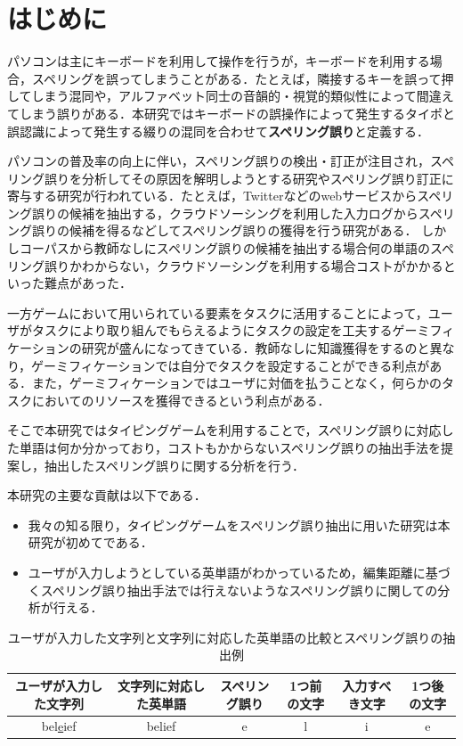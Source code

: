 \documentclass{jarticle}
\begin{document}
\mktitle
%
\renewcommand{\baselinestretch}{1.1}\small
%

\section{はじめに}
パソコンは主にキーボードを利用して操作を行うが，キーボードを利用する場合，スペリングを誤ってしまうことがある．たとえば，隣接するキーを誤って押してしまう混同や，アルファベット同士の音韻的・視覚的類似性によって間違えてしまう誤りがある．本研究ではキーボードの誤操作によって発生するタイポと誤認識によって発生する綴りの混同を合わせて\textbf{スペリング誤り}と定義する．

パソコンの普及率の向上に伴い，スペリング誤りの検出・訂正が注目され，スペリング誤りを分析してその原因を解明しようとする研究やスペリング誤り訂正に寄与する研究が行われている．たとえば，Twitterなどのwebサービスからスペリング誤りの候補を抽出する\cite{aramakiNLP2010}，クラウドソーシングを利用した入力ログからスペリング誤りの候補を得る\cite{babaACL2012}などしてスペリング誤りの獲得を行う研究がある．
しかしコーパスから教師なしにスペリング誤りの候補を抽出する場合何の単語のスペリング誤りかわからない，クラウドソーシングを利用する場合コストがかかるといった難点があった．

一方ゲームにおいて用いられている要素をタスクに活用することによって，ユーザがタスクにより取り組んでもらえるようにタスクの設定を工夫するゲーミフィケーションの研究が盛んになってきている\cite{deterdingACM2011}．教師なしに知識獲得をするのと異なり，ゲーミフィケーションでは自分でタスクを設定することができる利点がある．また，ゲーミフィケーションではユーザに対価を払うことなく，何らかのタスクにおいてのリソースを獲得できるという利点がある．

そこで本研究ではタイピングゲームを利用することで，スペリング誤りに対応した単語は何か分かっており，コストもかからないスペリング誤りの抽出手法を提案し，抽出したスペリング誤りに関する分析を行う．

本研究の主要な貢献は以下である．

\begin{itemize}
 \item 我々の知る限り，タイピングゲームをスペリング誤り抽出に用いた研究は本研究が初めてである．
 \item ユーザが入力しようとしている英単語がわかっているため，編集距離に基づくスペリング誤り抽出手法\cite{aramakiNLP2010}では行えないようなスペリング誤りに関しての分析が行える．
\end{itemize}

 \begin{table}[t]
  \small
  \begin{center}
   \caption{ユーザが入力した文字列と文字列に対応した英単語の比較とスペリング誤りの抽出例}
   \begin{tabular}{|c|c|c|c|c|c|} \hline
       	ユーザが入力した文字列 & 文字列に対応した英単語 & スペリング誤り & 1つ前の文字 & 入力すべき文字 & 1つ後の文字\\ \hline
	    bel\underline{e}ief & belief & e & l & i & e\\ \hline
   \end{tabular}
  \end{center}
 \end{table}
\end{document}
